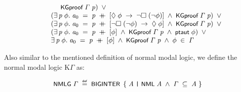 \documentclass[letterpaper]{article}
\renewcommand{\HOLConst}[1]{{\textsf{\upshape\small #1}}}
\newenvironment{holmath}{\begin{displaymath}\begin{array}{l}}{\end{array}\end{displaymath}\ignorespacesafterend}
\begin{document}
\begin{holmath}
\;\;\;\;\;\;\;\;\;\;\;\;\;\;\HOLConst{KGproof}\;\HOLFreeVar{\ensuremath{\Gamma}}\;\HOLBoundVar{p})\;\HOLSymConst{\HOLTokenDisj{}}\\
\;\;\;\;\;\;\;\;\;(\HOLSymConst{\HOLTokenExists{}}\HOLBoundVar{p}\;\HOLBoundVar{\ensuremath{\phi}}.\;\HOLFreeVar{a\sb{\mathrm{0}}}\;\HOLSymConst{=}\;\HOLBoundVar{p}\;\HOLSymConst{\HOLTokenDoublePlus}\;[\HOLSymConst{\ensuremath{\Diamond}}\;\HOLBoundVar{\ensuremath{\phi}}\;\HOLSymConst{\ensuremath{\rightarrow}}\;\HOLSymConst{\HOLTokenNeg{}}\HOLSymConst{\ensuremath{\Box}}\;(\HOLSymConst{\HOLTokenNeg{}}\HOLBoundVar{\ensuremath{\phi}})]\;\HOLSymConst{\HOLTokenConj{}}\;\HOLConst{KGproof}\;\HOLFreeVar{\ensuremath{\Gamma}}\;\HOLBoundVar{p})\;\HOLSymConst{\HOLTokenDisj{}}\\
\;\;\;\;\;\;\;\;\;(\HOLSymConst{\HOLTokenExists{}}\HOLBoundVar{p}\;\HOLBoundVar{\ensuremath{\phi}}.\;\HOLFreeVar{a\sb{\mathrm{0}}}\;\HOLSymConst{=}\;\HOLBoundVar{p}\;\HOLSymConst{\HOLTokenDoublePlus}\;[\HOLSymConst{\HOLTokenNeg{}}\HOLSymConst{\ensuremath{\Box}}\;(\HOLSymConst{\HOLTokenNeg{}}\HOLBoundVar{\ensuremath{\phi}})\;\HOLSymConst{\ensuremath{\rightarrow}}\;\HOLSymConst{\ensuremath{\Diamond}}\;\HOLBoundVar{\ensuremath{\phi}}]\;\HOLSymConst{\HOLTokenConj{}}\;\HOLConst{KGproof}\;\HOLFreeVar{\ensuremath{\Gamma}}\;\HOLBoundVar{p})\;\HOLSymConst{\HOLTokenDisj{}}\\
\;\;\;\;\;\;\;\;\;(\HOLSymConst{\HOLTokenExists{}}\HOLBoundVar{p}\;\HOLBoundVar{\ensuremath{\phi}}.\;\HOLFreeVar{a\sb{\mathrm{0}}}\;\HOLSymConst{=}\;\HOLBoundVar{p}\;\HOLSymConst{\HOLTokenDoublePlus}\;[\HOLBoundVar{\ensuremath{\phi}}]\;\HOLSymConst{\HOLTokenConj{}}\;\HOLConst{KGproof}\;\HOLFreeVar{\ensuremath{\Gamma}}\;\HOLBoundVar{p}\;\HOLSymConst{\HOLTokenConj{}}\;\HOLConst{ptaut}\;\HOLBoundVar{\ensuremath{\phi}})\;\HOLSymConst{\HOLTokenDisj{}}\\
\;\;\;\;\;\;\;\;\;\HOLSymConst{\HOLTokenExists{}}\HOLBoundVar{p}\;\HOLBoundVar{\ensuremath{\phi}}.\;\HOLFreeVar{a\sb{\mathrm{0}}}\;\HOLSymConst{=}\;\HOLBoundVar{p}\;\HOLSymConst{\HOLTokenDoublePlus}\;[\HOLBoundVar{\ensuremath{\phi}}]\;\HOLSymConst{\HOLTokenConj{}}\;\HOLConst{KGproof}\;\HOLFreeVar{\ensuremath{\Gamma}}\;\HOLBoundVar{p}\;\HOLSymConst{\HOLTokenConj{}}\;\HOLBoundVar{\ensuremath{\phi}}\;\HOLSymConst{\HOLTokenIn{}}\;\HOLFreeVar{\ensuremath{\Gamma}}
\end{holmath}

Also similar to the mentioned definition of normal modal logic, we define the normal modal logic K$\Gamma$ as:

\begin{holmath}
  \HOLConst{NMLG}\;\HOLFreeVar{\ensuremath{\Gamma}}\;\HOLSymConst{\HOLTokenDefEquality{}}\;\HOLConst{BIGINTER}\;\HOLTokenLeftbrace{}\HOLBoundVar{A}\;\HOLTokenBar{}\;\HOLConst{NML}\;\HOLBoundVar{A}\;\HOLSymConst{\HOLTokenConj{}}\;\HOLFreeVar{\ensuremath{\Gamma}}\;\HOLSymConst{\HOLTokenSubset{}}\;\HOLBoundVar{A}\HOLTokenRightbrace{}
\end{holmath}
\end{document}
